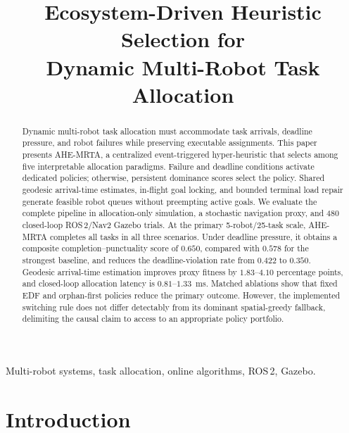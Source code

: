 \documentclass[10pt,letterpaper,onecolumn]{IEEEtran}
\begin{document}
\title{Ecosystem-Driven Heuristic Selection for\\
  Dynamic Multi-Robot Task Allocation}

\author{}

\maketitle

\begin{abstract}
Dynamic multi-robot task allocation must accommodate task arrivals, deadline
pressure, and robot failures while preserving executable assignments. This
paper presents AHE-MRTA, a centralized event-triggered hyper-heuristic that
selects among five interpretable allocation paradigms. Failure and deadline
conditions activate dedicated policies; otherwise, persistent dominance scores
select the policy. Shared geodesic arrival-time estimates, in-flight goal
locking, and bounded terminal load repair generate feasible robot queues
without preempting active goals. We evaluate the complete pipeline in
allocation-only simulation, a stochastic navigation proxy, and 480 closed-loop
ROS\,2/Nav2 Gazebo trials. At the primary 5-robot/25-task scale, AHE-MRTA
completes all tasks in all three scenarios. Under deadline pressure, it obtains
a composite completion--punctuality score of $0.650$, compared with $0.578$ for
the strongest baseline, and reduces the deadline-violation rate from $0.422$ to
$0.350$. Geodesic arrival-time estimation improves proxy fitness by
$1.83$--$4.10$ percentage points, and closed-loop allocation latency is
$0.81$--$1.33$~ms. Matched ablations show that fixed EDF and orphan-first
policies reduce the primary outcome. However, the implemented switching rule
does not differ detectably from its dominant spatial-greedy fallback, delimiting
the causal claim to access to an appropriate policy portfolio.
\end{abstract}

\begin{IEEEkeywords}
Multi-robot systems, task allocation, online algorithms, ROS\,2, Gazebo.
\end{IEEEkeywords}

\section{Introduction}
\label{sec:intro}
\end{document}
